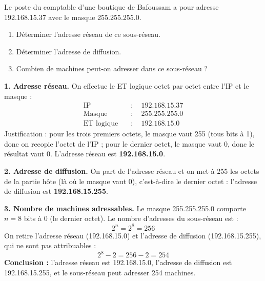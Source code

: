 \documentclass[11pt]{article}
\begin{document}
\begin{exoresolu}
Le poste du comptable d'une boutique de Bafoussam a pour adresse 192.168.15.37 avec le masque 255.255.255.0.
\begin{enumerate}
\item Déterminer l'adresse réseau de ce sous-réseau.
\item Déterminer l'adresse de diffusion.
\item Combien de machines peut-on adresser dans ce sous-réseau ?
\end{enumerate}
\tcblower
\textbf{1. Adresse réseau.} On effectue le ET logique octet par octet entre l'IP et le masque :
\begin{align*}
\text{IP} \quad &: \quad 192.168.15.37\\
\text{Masque} \quad &: \quad 255.255.255.0\\
\text{ET logique} \quad &: \quad 192.168.15.0
\end{align*}
Justification : pour les trois premiers octets, le masque vaut 255 (tous bits à 1), donc on recopie l'octet de l'IP ; pour le dernier octet, le masque vaut 0, donc le résultat vaut 0. L'adresse réseau est \textbf{192.168.15.0}.

\textbf{2. Adresse de diffusion.} On part de l'adresse réseau et on met à 255 les octets de la partie hôte (là où le masque vaut 0), c'est-à-dire le dernier octet : l'adresse de diffusion est \textbf{192.168.15.255}.

\textbf{3. Nombre de machines adressables.} Le masque 255.255.255.0 comporte $n = 8$ bits à 0 (le dernier octet). Le nombre d'adresses du sous-réseau est :
\[ 2^{n} = 2^{8} = 256 \]
On retire l'adresse réseau (192.168.15.0) et l'adresse de diffusion (192.168.15.255), qui ne sont pas attribuables :
\[ 2^{8} - 2 = 256 - 2 = 254 \]
\textbf{Conclusion :} l'adresse réseau est 192.168.15.0, l'adresse de diffusion est 192.168.15.255, et le sous-réseau peut adresser 254 machines.
\end{exoresolu}
\end{document}
